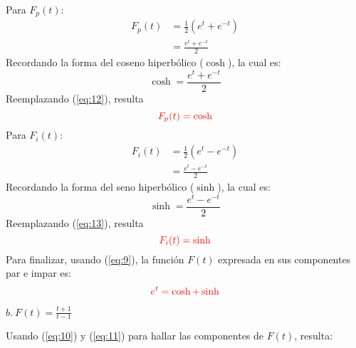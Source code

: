 \begin{multicols}{2}
Para $F_p(t)$:
\begin{align*}
    F_p(t) &= \frac{1}{2}\left(e^{t} + e^{-t}\right)\\
    &= \frac{e^{t} + e^{-t}}{2}
\end{align*}
Recordando la forma del coseno hiperbólico ($\cosh$), la cual es:
\begin{equation}
    \cosh = \frac{e^{t} + e^{-t}}{2}
    \label{eq:12}
\end{equation}
Reemplazando (\ref{eq:12}), resulta
\begin{equation}
    \textcolor{rojo}{F_p(t) = \cosh}
    \label{res:9}
\end{equation}
Para $F_i(t)$:
\begin{align*}
    F_i(t) &= \frac{1}{2}\left(e^{t} - e^{-t}\right)\\
    &= \frac{e^{t} - e^{-t}}{2}
\end{align*}
Recordando la forma del seno hiperbólico ($\sinh$), la cual es:
\begin{equation}
    \sinh = \frac{e^{t} - e^{-t}}{2}
    \label{eq:13}
\end{equation}
Reemplazando (\ref{eq:13}), resulta
\begin{equation}
    \textcolor{rojo}{F_i(t) = \sinh}
    \label{res:10}
\end{equation}
Para finalizar, usando (\ref{eq:9}), la función $F(t)$ expresada en sus componentes par e impar es:
\begin{equation}
    \textcolor{rojo}{e^{t} = \cosh + \sinh}
    \label{res:11}
\end{equation}

$b.~F(t) = \frac{t+1}{t-1}$

Usando (\ref{eq:10}) y (\ref{eq:11}) para hallar las componentes de $F(t)$, resulta:


\end{multicols}
